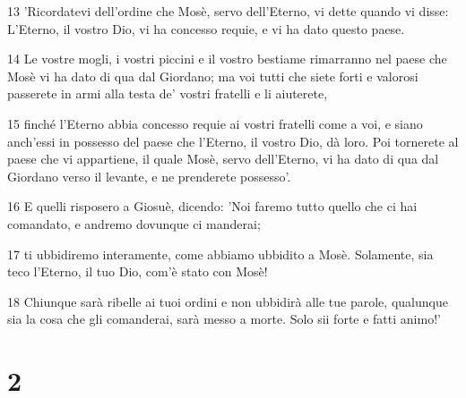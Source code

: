 \par 13 'Ricordatevi dell'ordine che Mosè, servo dell'Eterno, vi dette quando vi disse: L'Eterno, il vostro Dio, vi ha concesso requie, e vi ha dato questo paese.
\par 14 Le vostre mogli, i vostri piccini e il vostro bestiame rimarranno nel paese che Mosè vi ha dato di qua dal Giordano; ma voi tutti che siete forti e valorosi passerete in armi alla testa de' vostri fratelli e li aiuterete,
\par 15 finché l'Eterno abbia concesso requie ai vostri fratelli come a voi, e siano anch'essi in possesso del paese che l'Eterno, il vostro Dio, dà loro. Poi tornerete al paese che vi appartiene, il quale Mosè, servo dell'Eterno, vi ha dato di qua dal Giordano verso il levante, e ne prenderete possesso'.
\par 16 E quelli risposero a Giosuè, dicendo: 'Noi faremo tutto quello che ci hai comandato, e andremo dovunque ci manderai;
\par 17 ti ubbidiremo interamente, come abbiamo ubbidito a Mosè. Solamente, sia teco l'Eterno, il tuo Dio, com'è stato con Mosè!
\par 18 Chiunque sarà ribelle ai tuoi ordini e non ubbidirà alle tue parole, qualunque sia la cosa che gli comanderai, sarà messo a morte. Solo sii forte e fatti animo!'

\chapter{2}

